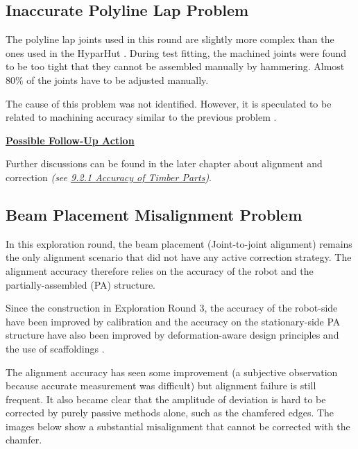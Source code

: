 \subsection{Inaccurate Polyline Lap Problem}
\label{subsection:exploration_5_inaccurate_polyline_lap_problem}

The polyline lap joints used in this round are slightly more complex than the ones used in the HyparHut . During test fitting, the machined joints were found to be too tight that they cannot be assembled manually by hammering. Almost 80$\%$ of the joints have to be adjusted manually. 

The cause of this problem was not identified. However, it is speculated to be related to machining accuracy similar to the previous problem .

\textbf{\ul{Possible Follow-Up Action}}

Further discussions can be found in the later chapter about alignment and correction \textit{(see \ul{9.2.1 Accuracy of Timber Parts})}.

\subsection{Beam Placement Misalignment Problem}
\label{subsection:exploration_5_beam_placement_misalignment_problem}

In this exploration round, the beam placement (Joint-to-joint alignment) remains the only alignment scenario that did not have any active correction strategy. The alignment accuracy therefore relies on the accuracy of the robot and the partially-assembled (PA) structure. 

Since the construction in Exploration Round 3, the accuracy of the robot-side have been improved by calibration  and the accuracy on the stationary-side PA structure have also been improved by deformation-aware design principles  and the use of scaffoldings  .

The alignment accuracy has seen some improvement (a subjective observation because accurate measurement was difficult) but alignment failure is still frequent. It also became clear that the amplitude of deviation is hard to be corrected by purely passive methods alone, such as the chamfered edges. The images below show a substantial misalignment that cannot be corrected with the chamfer. 

